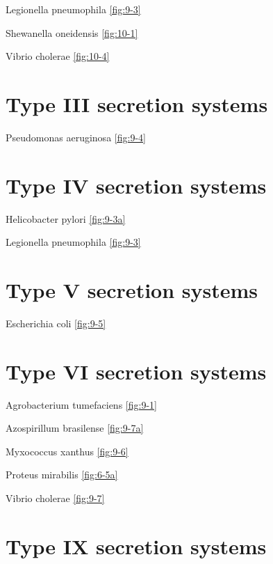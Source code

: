\documentclass[]{tufte-book}
\begin{document}
Legionella pneumophila \ref{fig:9-3}

Shewanella oneidensis \ref{fig:10-1}

Vibrio cholerae \ref{fig:10-4}

\hypertarget{type-iii-secretion-systems}{%
\section*{Type III secretion systems}\label{type-iii-secretion-systems}}

Pseudomonas aeruginosa \ref{fig:9-4}

\hypertarget{type-iv-secretion-systems}{%
\section*{Type IV secretion systems}\label{type-iv-secretion-systems}}

Helicobacter pylori \ref{fig:9-3a}

Legionella pneumophila \ref{fig:9-3}

\hypertarget{type-v-secretion-systems}{%
\section*{Type V secretion systems}\label{type-v-secretion-systems}}

Escherichia coli \ref{fig:9-5}

\hypertarget{type-vi-secretion-systems}{%
\section*{Type VI secretion systems}\label{type-vi-secretion-systems}}

Agrobacterium tumefaciens \ref{fig:9-1}

Azospirillum brasilense \ref{fig:9-7a}

Myxococcus xanthus \ref{fig:9-6}

Proteus mirabilis \ref{fig:6-5a}

Vibrio cholerae \ref{fig:9-7}

\hypertarget{type-ix-secretion-systems}{%
\section*{Type IX secretion systems}\label{type-ix-secretion-systems}}
\end{document}
